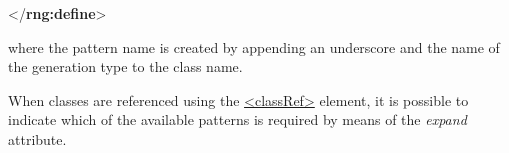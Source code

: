 \begin{shaded}
\mbox{}\newline 
\hspace*{1em}\mbox{}\newline 
{}\mbox{}\newline 
{}\mbox{}\newline 
\hspace*{1em}\mbox{}\newline 
{}\mbox{}\newline 
{}\mbox{}\newline 
\hspace*{1em}\mbox{}\newline 
{}\mbox{}\newline 
{</\textbf{rng:define}>}\end{shaded}\egroup\par \noindent  where the pattern name is created by appending an underscore and the name of the generation type to the class name.\par
When classes are referenced using the \hyperref[TEI.classRef]{<classRef>} element, it is possible to indicate which of the available patterns is required by means of the {\itshape expand} attribute.\par
